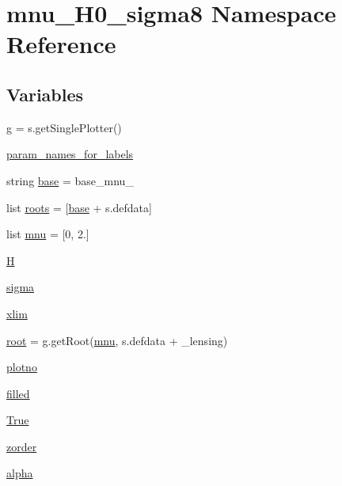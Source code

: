 \hypertarget{namespacemnu__H0__sigma8}{}\section{mnu\+\_\+\+H0\+\_\+sigma8 Namespace Reference}
\label{namespacemnu__H0__sigma8}
\subsection*{Variables}
\begin{DoxyCompactItemize}
\item 
\mbox{\hyperlink{namespacemnu__H0__sigma8_ae807dd08418aaac3c1a8239fa1f06491}{g}} = s.\+get\+Single\+Plotter()
\item 
\mbox{\hyperlink{namespacemnu__H0__sigma8_ac3aa68d175aa1b7be335a1dde04366f7}{param\+\_\+names\+\_\+for\+\_\+labels}}
\item 
string \mbox{\hyperlink{namespacemnu__H0__sigma8_a83d0a6bc92d586b13dfab6d2e3a43103}{base}} = \textquotesingle{}base\+\_\+mnu\+\_\+\textquotesingle{}
\item 
list \mbox{\hyperlink{namespacemnu__H0__sigma8_ab6b3803cd7620feeb53bb4f0cdc5b5d7}{roots}} = \mbox{[}\mbox{\hyperlink{namespacemnu__H0__sigma8_a83d0a6bc92d586b13dfab6d2e3a43103}{base}} + s.\+defdata\mbox{]}
\item 
list \mbox{\hyperlink{namespacemnu__H0__sigma8_a0c9d27e0d475e93e0a35e9544db1fcef}{mnu}} = \mbox{[}0, 2.\mbox{]}
\item 
\mbox{\hyperlink{namespacemnu__H0__sigma8_a47d55f5ac1c7c046d07cf4ade0698a9f}{H}}
\item 
\mbox{\hyperlink{namespacemnu__H0__sigma8_a343080c937724946945939acbe4cb835}{sigma}}
\item 
\mbox{\hyperlink{namespacemnu__H0__sigma8_ad99eac599c28569643e504a27120c14e}{xlim}}
\item 
\mbox{\hyperlink{namespacemnu__H0__sigma8_a504a9330175060e5f4fbe045a6b797ab}{root}} = g.\+get\+Root(\textquotesingle{}\mbox{\hyperlink{namespacemnu__H0__sigma8_a0c9d27e0d475e93e0a35e9544db1fcef}{mnu}}\textquotesingle{}, s.\+defdata + \textquotesingle{}\+\_\+lensing\textquotesingle{})
\item 
\mbox{\hyperlink{namespacemnu__H0__sigma8_a80f660c2735599b75b6e7e0cd8ecc5d4}{plotno}}
\item 
\mbox{\hyperlink{namespacemnu__H0__sigma8_ac99f18cdf17c6b347d93744de957d89a}{filled}}
\item 
\mbox{\hyperlink{namespacemnu__H0__sigma8_a230d33bda9312eb8fd67141177972b0e}{True}}
\item 
\mbox{\hyperlink{namespacemnu__H0__sigma8_a7488c9eb9b2eea017103c2fe7fb3daca}{zorder}}
\item 
\mbox{\hyperlink{namespacemnu__H0__sigma8_a0c04c04a593dc882b5743de0dbc7658c}{alpha}}
\end{DoxyCompactItemize}


